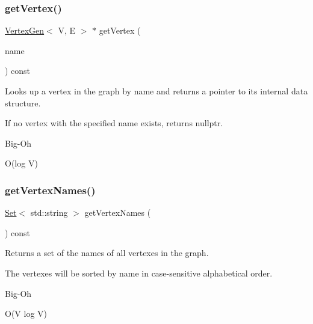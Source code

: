 \subsubsection{\texorpdfstring{get\+Vertex()}{getVertex()}}
{\footnotesize\ttfamily \mbox{\hyperlink{classVertexGen}{Vertex\+Gen}}$<$ V, E $>$ $\ast$ get\+Vertex (\begin{DoxyParamCaption}\item[{const std\+::string \&}]{name }\end{DoxyParamCaption}) const}



Looks up a vertex in the graph by name and returns a pointer to its internal data structure. 

If no vertex with the specified name exists, returns nullptr. \begin{DoxyRefDesc}{Big-\/\+Oh}
\item[\mbox{\hyperlink{BigOh__BigOh000026}{Big-\/\+Oh}}]O(log V) \end{DoxyRefDesc}
\mbox{\label{classBasicGraphGen_ae1bca1f87888bd787f836bc064a9ff01}} 
\subsubsection{\texorpdfstring{get\+Vertex\+Names()}{getVertexNames()}}
{\footnotesize\ttfamily \mbox{\hyperlink{classstanfordcpplib_1_1collections_1_1GenericSet}{Set}}$<$ std\+::string $>$ get\+Vertex\+Names (\begin{DoxyParamCaption}{ }\end{DoxyParamCaption}) const}



Returns a set of the names of all vertexes in the graph. 

The vertexes will be sorted by name in case-\/sensitive alphabetical order. \begin{DoxyRefDesc}{Big-\/\+Oh}
\item[\mbox{\hyperlink{BigOh__BigOh000027}{Big-\/\+Oh}}]O(\+V log V) \end{DoxyRefDesc}
\mbox{\label{classBasicGraphGen_aec896ef5b1fc6044fc71318d1369f6f1}} 
